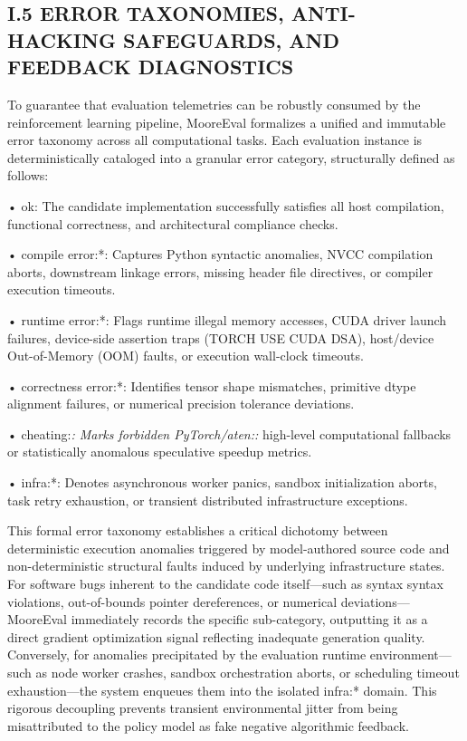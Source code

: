 \documentclass[
  10
]{article}
\begin{document}
\subsection{I.5 ERROR TAXONOMIES, ANTI-HACKING SAFEGUARDS, AND FEEDBACK
DIAGNOSTICS}\label{i.5-error-taxonomies-anti-hacking-safeguards-and-feedback-diagnostics}

To guarantee that evaluation telemetries can be robustly consumed by the
reinforcement learning pipeline, MooreEval formalizes a unified and
immutable error taxonomy across all computational tasks. Each evaluation
instance is deterministically cataloged into a granular error category,
structurally defined as follows:

• ok: The candidate implementation successfully satisfies all host
compilation, functional correctness, and architectural compliance
checks.

• compile error:*: Captures Python syntactic anomalies, NVCC compilation
aborts, downstream linkage errors, missing header file directives, or
compiler execution timeouts.

• runtime error:*: Flags runtime illegal memory accesses, CUDA driver
launch failures, device-side assertion traps (TORCH USE CUDA DSA),
host/device Out-of-Memory (OOM) faults, or execution wall-clock
timeouts.

• correctness error:*: Identifies tensor shape mismatches, primitive
dtype alignment failures, or numerical precision tolerance deviations.

• cheating:\emph{: Marks forbidden PyTorch/aten::} high-level
computational fallbacks or statistically anomalous speculative speedup
metrics.

• infra:*: Denotes asynchronous worker panics, sandbox initialization
aborts, task retry exhaustion, or transient distributed infrastructure
exceptions.

This formal error taxonomy establishes a critical dichotomy between
deterministic execution anomalies triggered by model-authored source
code and non-deterministic structural faults induced by underlying
infrastructure states. For software bugs inherent to the candidate code
itself---such as syntax syntax violations, out-of-bounds pointer
dereferences, or numerical deviations---MooreEval immediately records
the specific sub-category, outputting it as a direct gradient
optimization signal reflecting inadequate generation quality.
Conversely, for anomalies precipitated by the evaluation runtime
environment---such as node worker crashes, sandbox orchestration aborts,
or scheduling timeout exhaustion---the system enqueues them into the
isolated infra:* domain. This rigorous decoupling prevents transient
environmental jitter from being misattributed to the policy model as
fake negative algorithmic feedback.
\end{document}
